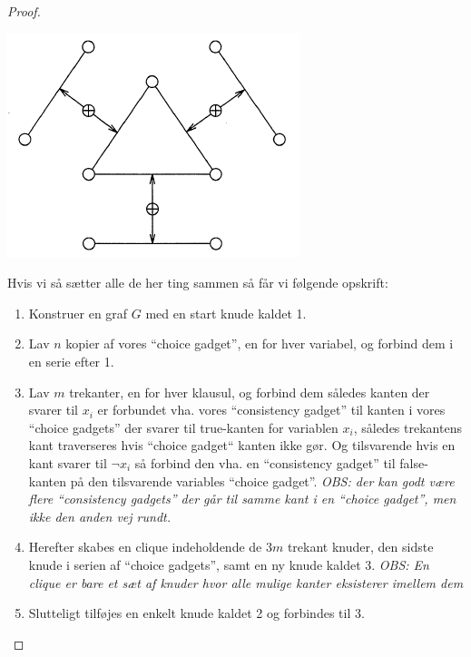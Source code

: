 \begin{proof}
\begin{center}
 \includegraphics[bb=0 0 241 185]{img/constraintGadget.png}
\end{center}

Hvis vi så sætter alle de her ting sammen så får vi følgende opskrift:\\
\begin{enumerate}
 \item Konstruer en graf $G$ med en start knude kaldet 1.

 \item Lav $n$ kopier af vores ``choice gadget'', en for hver variabel, og
	 forbind dem i en serie efter 1.

 \item Lav $m$ trekanter, en for hver klausul, og forbind dem således kanten
	 der svarer til $x_i$ er forbundet vha. vores ``consistency gadget'' til
	 kanten i vores ``choice gadgets'' der svarer til true-kanten for variablen
	 $x_i$, således trekantens kant traverseres hvis ``choice gadget`` kanten
	 ikke gør. Og tilsvarende hvis en kant svarer til $\neg x_i$ så forbind den
	 vha. en ``consistency gadget'' til false-kanten på den tilsvarende
	 variables ``choice gadget''. 
	 \textit{OBS: der kan godt være flere ``consistency gadgets'' der går til
	 samme kant i en ``choice gadget'', men ikke den anden vej rundt.}

 \item Herefter skabes en clique indeholdende de $3m$ trekant knuder, den
	 sidste knude i serien af ``choice gadgets'', samt en ny knude kaldet 3.
	 \textit{OBS: En clique er bare et sæt af knuder hvor alle mulige kanter
	 eksisterer imellem dem}

 \item Slutteligt tilføjes en enkelt knude kaldet 2 og forbindes til 3.


\end{enumerate}
\end{proof}
